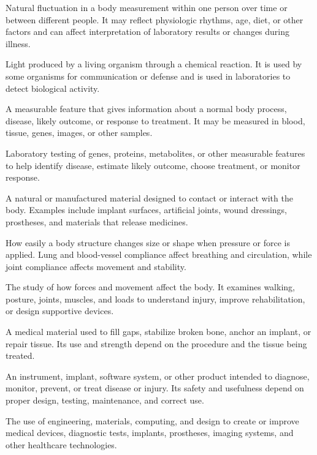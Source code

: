  Natural fluctuation in a body measurement within
one person over time or between different people. It may reflect physiologic
rhythms, age, diet, or other factors and can affect interpretation of
laboratory results or changes during illness.

 Light produced by a living organism through a chemical reaction. It is used by some organisms for communication or defense and is used in laboratories to detect biological activity.

 A measurable feature that gives information about a normal body process, disease, likely outcome, or response to treatment. It may be measured in blood, tissue, genes, images, or other samples.

 Laboratory testing of genes, proteins, metabolites, or other measurable features to help identify disease, estimate likely outcome, choose treatment, or monitor response.

 A natural or manufactured material designed to contact or interact with the body. Examples include implant surfaces, artificial joints, wound dressings, prostheses, and materials that release medicines.

 How easily a body structure changes size or shape when pressure or force is applied. Lung and blood-vessel compliance affect breathing and circulation, while joint compliance affects movement and stability.

 The study of how forces and movement affect the body. It examines walking, posture, joints, muscles, and loads to understand injury, improve rehabilitation, or design supportive devices.

 A medical material used to fill gaps, stabilize broken bone, anchor an implant, or repair tissue. Its use and strength depend on the procedure and the tissue being treated.

 An instrument, implant, software system, or other product intended to diagnose, monitor, prevent, or treat disease or injury. Its safety and usefulness depend on proper design, testing, maintenance, and correct use.

 The use of engineering, materials, computing, and design to create or improve medical devices, diagnostic tests, implants, prostheses, imaging systems, and other healthcare technologies.

